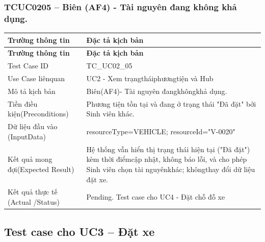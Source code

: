 \subsubsection{TCUC0205 – Biên (AF4) - Tài nguyên đang không khả dụng.}
\begin{longtable}{|L{0.24\textwidth}|L{0.70\textwidth}|}
\hline
\textbf{Trường thông tin} & \textbf{Đặc tả kịch bản} \\
\hline
\endfirsthead
\hline
\textbf{Trường thông tin} & \textbf{Đặc tả kịch bản} \\
\hline
\endhead
Test Case ID & TC\_UC02\_05 \\
\hline
Use Case liênquan & UC2 - Xem trạngtháiphươngtiện và Hub \\
\hline
Mô tả kịch bản & Biên(AF4)- Tài nguyên đangkhôngkhả dụng. \\
\hline
Tiền điều kiện\newline (Preconditions) & Phương tiện tồn tại và đang ở trạng thái "Đã đặt" bởi Sinh viên khác. \\
\hline
Dữ liệu đầu vào (Input\newline Data) & resourceType=VEHICLE; resourceId="V-0020" \\
\hline
Kết quả mong đợi\newline (Expected Result) & Hệ thống vẫn hiển thị trạng thái hiện tại ("Đã đặt") kèm thời điểm\newline cập nhật, không báo lỗi, và cho phép Sinh viên chọn tài nguyên\newline khác; khôngthay đổi dữ liệu đặt xe. \\
\hline
Kết quả thực tế (Actual /\newline Status) & Pending. Test case cho UC4 - Đặt chỗ đỗ xe \\
\hline
\end{longtable}
\vspace{-0.5\baselineskip}
\subsection{Test case cho UC3 – Đặt xe}
